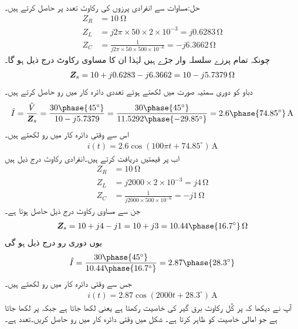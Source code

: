 حل:مساوات  سے انفرادی پرزوں کی رکاوٹ  تعدد پر حاصل کرتے ہیں۔
\begin{align*}
Z_R&=\SI{10}{\ohm}\\
Z_L&=j 2 \pi \times 50 \times 2\times 10^{-3}=j0.6283 \, \si{\ohm}\\
Z_C&=\frac{1}{j 2\pi \times 50 \times 500 \times 10^{-6}}=-j6.3662\, \si{\ohm}
\end{align*}
چونکہ تمام پرزے سلسلہ وار جڑے ہیں لہٰذا ان کا مساوی رکاوٹ درج ذیل ہو گا۔
\begin{align*}
{\ensuremath{{\boldsymbol{Z}}}}_s=10+j0.6283-j6.3662=10-j5.7379 \, \si{\ohm}
\end{align*}
دباو کو دوری سمتیہ صورت میں لکھتے ہوئے تعددی دائرہ کار میں رو حاصل کرتے ہیں۔
\begin{align*}
\hat{I}=\frac{\hat{V}}{\bZ_s}=\frac{30\phase{45^{\circ}}}{10-j5.7379}=\frac{30\phase{45^{\circ}}}{11.5292\phase{-29.85^{\circ}}}=2.6\phase{74.85^{\circ}} \, \si{\ampere}
\end{align*}
اس سے وقتی دائرہ کار میں رو لکھتے ہیں۔
\begin{align*}
i(t)=2.6\cos(100\pi t +74.85^{\circ})\, \si{\ampere}
\end{align*}
اب  پر قیمتیں دریافت کرتے ہیں۔انفرادی رکاوٹ درج ذیل ہیں
\begin{align*}
Z_R&=\SI{10}{\ohm}\\
Z_L&=j 2000\times 2\times 10^{-3}=j4 \, \si{\ohm}\\
Z_C&=\frac{1}{j 2000\times 500 \times 10^{-6}}=-j1\, \si{\ohm}
\end{align*}
جن سے مساوی رکاوٹ درج ذیل حاصل ہوتا ہے۔
\begin{align*}
\bZ_s=10+j4-j1=10+j3=10.44\phase{16.7^{\circ}} \, \si{\ohm}
\end{align*}
یوں دوری رو درج ذیل ہو گی
\begin{align*}
\hat{I}=\frac{30\phase{45^{\circ}}}{10.44\phase{16.7^{\circ}}}=2.87\phase{28.3^{\circ}}
\end{align*}
جس سے وقتی دائرہ کار میں رو لکھتے ہیں۔
\begin{align*}
i(t)=2.87\cos(2000t+28.3^{\circ})\, \si{\ampere}
\end{align*}
آپ نے دیکھا کہ  پر کُل رکاوٹ برق گیر کی خاصیت رکھتا ہے یعنی  لکھا جاتا ہے جبکہ  پر  لکھا جاتا ہے جو امالی خاصیت کو ظاہر کرتا ہے۔
شکل  میں وقتی دائرہ کار میں رو حاصل کریں۔تعدد  ہے۔

